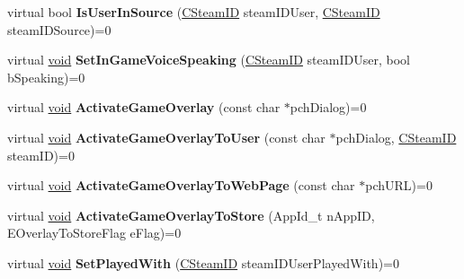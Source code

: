 \begin{DoxyCompactItemize}
\item 
\hypertarget{classISteamFriends_ac52308fb74d4b3fe72a29d896eceb2c1}{}virtual bool {\bfseries Is\+User\+In\+Source} (\hyperlink{classCSteamID}{C\+Steam\+I\+D} steam\+I\+D\+User, \hyperlink{classCSteamID}{C\+Steam\+I\+D} steam\+I\+D\+Source)=0\label{classISteamFriends_ac52308fb74d4b3fe72a29d896eceb2c1}

\item 
\hypertarget{classISteamFriends_ac6de0a382cf904b81aba7a2ecdf45d1e}{}virtual \hyperlink{SDL__audio_8h_a52835ae37c4bb905b903cbaf5d04b05f}{void} {\bfseries Set\+In\+Game\+Voice\+Speaking} (\hyperlink{classCSteamID}{C\+Steam\+I\+D} steam\+I\+D\+User, bool b\+Speaking)=0\label{classISteamFriends_ac6de0a382cf904b81aba7a2ecdf45d1e}

\item 
\hypertarget{classISteamFriends_a6fef6a8e1f6a4b54e46392b8066a2bc1}{}virtual \hyperlink{SDL__audio_8h_a52835ae37c4bb905b903cbaf5d04b05f}{void} {\bfseries Activate\+Game\+Overlay} (const char $\ast$pch\+Dialog)=0\label{classISteamFriends_a6fef6a8e1f6a4b54e46392b8066a2bc1}

\item 
\hypertarget{classISteamFriends_abdf45d1ba2d1daffc0d09bf6ac1565a7}{}virtual \hyperlink{SDL__audio_8h_a52835ae37c4bb905b903cbaf5d04b05f}{void} {\bfseries Activate\+Game\+Overlay\+To\+User} (const char $\ast$pch\+Dialog, \hyperlink{classCSteamID}{C\+Steam\+I\+D} steam\+I\+D)=0\label{classISteamFriends_abdf45d1ba2d1daffc0d09bf6ac1565a7}

\item 
\hypertarget{classISteamFriends_a4bc559ed248ea4738d5a08fdf134e26a}{}virtual \hyperlink{SDL__audio_8h_a52835ae37c4bb905b903cbaf5d04b05f}{void} {\bfseries Activate\+Game\+Overlay\+To\+Web\+Page} (const char $\ast$pch\+U\+R\+L)=0\label{classISteamFriends_a4bc559ed248ea4738d5a08fdf134e26a}

\item 
\hypertarget{classISteamFriends_a13c43e63a8e92cd113032a8934953d09}{}virtual \hyperlink{SDL__audio_8h_a52835ae37c4bb905b903cbaf5d04b05f}{void} {\bfseries Activate\+Game\+Overlay\+To\+Store} (App\+Id\+\_\+t n\+App\+I\+D, E\+Overlay\+To\+Store\+Flag e\+Flag)=0\label{classISteamFriends_a13c43e63a8e92cd113032a8934953d09}

\item 
\hypertarget{classISteamFriends_a9a1585d9277f80b9dd22f268b2b16f73}{}virtual \hyperlink{SDL__audio_8h_a52835ae37c4bb905b903cbaf5d04b05f}{void} {\bfseries Set\+Played\+With} (\hyperlink{classCSteamID}{C\+Steam\+I\+D} steam\+I\+D\+User\+Played\+With)=0\label{classISteamFriends_a9a1585d9277f80b9dd22f268b2b16f73}


\end{DoxyCompactItemize}
